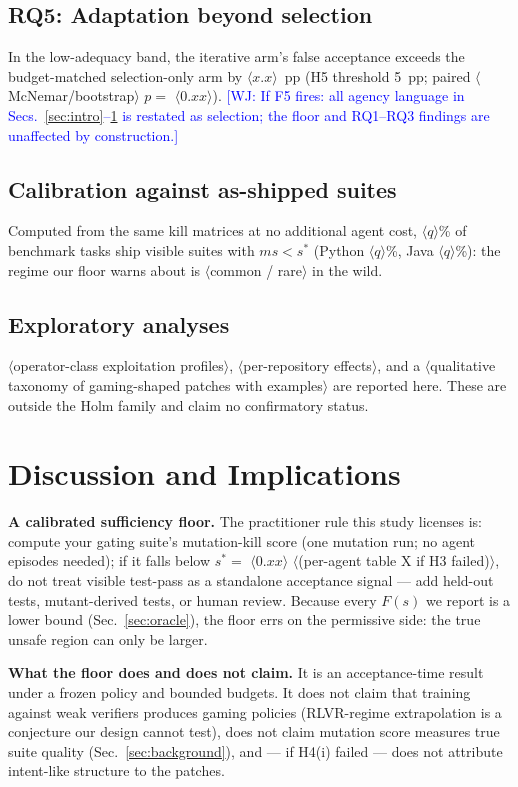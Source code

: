 \documentclass[conference]{IEEEtran}
\newcommand{\PH}[1]{\colorbox{gray!18}{\small$\langle$#1$\rangle$}}
\newcommand{\wj}[1]{\textcolor{blue}{\footnotesize [WJ: #1]}}
\newcommand{\ms}{\ensuremath{\mathit{ms}}}
\newcommand{\Fs}{\ensuremath{F(s)}}
\begin{document}
\subsection{RQ5: Adaptation beyond selection}
In the low-adequacy band, the iterative arm's false acceptance exceeds
the budget-matched selection-only arm by \PH{$x.x$}~pp
(H5 threshold 5~pp; paired \PH{McNemar/bootstrap} $p = $ \PH{$0.xx$}).
\wj{If F5 fires: all agency language in
Secs.~\ref{sec:intro}--\ref{sec:discussion} is restated as selection;
the floor and RQ1--RQ3 findings are unaffected by construction.}

\subsection{Calibration against as-shipped suites}
Computed from the same kill matrices at no additional agent cost,
\PH{$q$}\% of benchmark tasks ship visible suites with
$\ms < s^\ast$ (Python \PH{$q$}\%, Java \PH{$q$}\%): the regime our
floor warns about is \PH{common / rare} in the wild.

\subsection{Exploratory analyses}\label{sec:exploratory}
\PH{operator-class exploitation profiles}, \PH{per-repository
effects}, and a \PH{qualitative taxonomy of gaming-shaped patches with
examples} are reported here. These are
outside the Holm family and claim no confirmatory status.

\section{Discussion and Implications}\label{sec:discussion}

\textbf{A calibrated sufficiency floor.} The practitioner rule this
study licenses is: compute your gating suite's mutation-kill score
(one mutation run; no agent episodes needed); if it falls below
$s^\ast = $ \PH{$0.xx$} \PH{(per-agent table X if H3 failed)}, do not
treat visible test-pass as a standalone acceptance signal --- add held-out
tests, mutant-derived tests, or human review. Because every \Fs{} we
report is a lower bound (Sec.~\ref{sec:oracle}), the floor errs on the
permissive side: the true unsafe region can only be larger.

\textbf{What the floor does and does not claim.} It is an
acceptance-time result under a frozen policy and bounded budgets. It
does not claim that training against weak verifiers produces gaming
policies (RLVR-regime extrapolation is a conjecture our design cannot
test), does not claim mutation score measures true suite quality
(Sec.~\ref{sec:background}), and --- if H4(i) failed --- does not
attribute intent-like structure to the patches.
\end{document}

